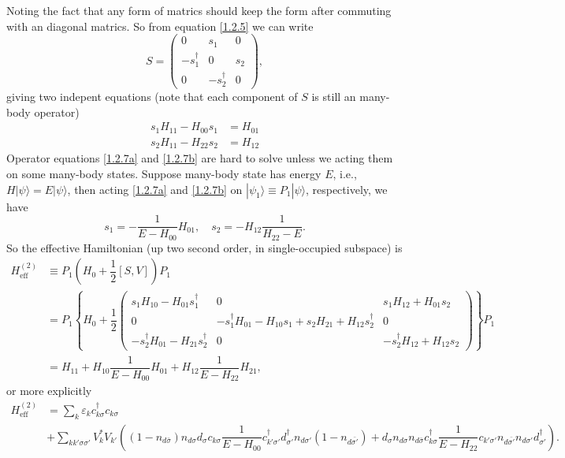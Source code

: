 \documentclass[aps,prx,superscriptaddress,onecolumn,preprintnumbers,nofootinbib,longbibliography]{revtex4-1}
\begin{document}
		Noting the fact that any form of matrics should keep the form after commuting with an diagonal matrics. So from equation \eqref{1.2.5} we can write
		\begin{equation*}
			S=\left(\begin{array}{ccc}
				0&s_1&0\\-s_1^\dagger&0&s_2\\0&-s_2^\dagger&0
			\end{array}\right),
		\end{equation*}
		giving two indepent equations (note that each component of $S$ is still an many-body operator)
		\begin{subequations}
			\begin{align}
				s_1H_{11}-H_{00}s_1&=H_{01}\label{1.2.7a}\\
				s_2H_{11}-H_{22}s_2&=H_{12}\label{1.2.7b}
			\end{align}
		\end{subequations}
		Operator equations \eqref{1.2.7a} and \eqref{1.2.7b} are hard to solve unless we acting them on some many-body states. Suppose many-body state has energy $E$, i.e., $H|\psi\rangle=E|\psi\rangle$, then acting \eqref{1.2.7a} and \eqref{1.2.7b} on $|\psi_1\rangle\equiv P_1|\psi\rangle$, respectively, we have
		\begin{equation}\label{1.2.8}
			s_1=-\dfrac{1}{E-H_{00}}H_{01},\quad s_2=-H_{12}\dfrac{1}{H_{22}-E}.
		\end{equation}
		So the effective Hamiltonian (up two second order, in single-occupied subspace) is
		\begin{align}
			H^{(2)}_{\text{eff}}&\equiv P_1\left(H_0+\dfrac{1}{2}[S,V]\right)P_1\nonumber\\
			&=P_1\left\{H_0+\dfrac{1}{2}\left(\begin{array}{ccc}
				s_1H_{10}-H_{01}s_1^\dagger&0&s_1H_{12}+H_{01}s_2\\
				0&-s_1^\dagger H_{01}-H_{10}s_1+s_2H_{21}+H_{12}s_2^\dagger&0\\
				-s_2^\dagger H_{01}-H_{21}s_2^\dagger&0&-s_2^\dagger H_{12}+H_{12}s_2
			\end{array}\right) \right\}P_1\nonumber\\
			&=H_{11}+H_{10}\dfrac{1}{E-H_{00}}H_{01}+H_{12}\dfrac{1}{E-H_{22}}H_{21},\label{1.2.9}
		\end{align}
		or more explicitly %
		\begin{align}
			H_{\text{eff}}^{(2)}&=\sum_{k}\varepsilon_k c_{k\sigma}^\dagger c_{k\sigma}\nonumber\\
			&+\sum_{kk'\sigma\sigma'}V_k^*V_{k'}\left((1-n_{d\bar{\sigma}})n_{d\sigma}d_\sigma c_{k\sigma}\dfrac{1}{E-H_{00}}c_{k'\sigma'}^\dagger d_{\sigma'}^\dagger n_{d\sigma'}(1-n_{d\bar{\sigma'}})+d_\sigma n_{d\sigma}n_{d\bar{\sigma}}c_{k\sigma}^\dagger\dfrac{1}{E-H_{22}}c_{k'\sigma'}n_{d\bar{\sigma'}}n_{d\sigma'}d_{\sigma'}^\dagger \right).\label{1.2.10}
		\end{align}
\end{document}

